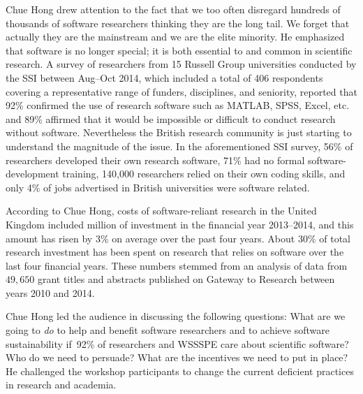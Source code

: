 \documentclass[11pt, oneside]{amsart}
\begin{document}
Chue Hong drew attention to the fact that we too often disregard hundreds of
thousands of software researchers thinking they are the long tail. We forget
that actually they are the mainstream and we are the elite minority. He
emphasized that software is no longer special; it is both essential to and
common in scientific research. A survey of researchers from 15 Russell Group
universities conducted by the SSI between Aug--Oct 2014, which included a total
of 406 respondents covering a representative range of funders, disciplines, and
seniority, reported that 92\% confirmed the use of research software such as
MATLAB, SPSS, Excel, etc. and 89\% affirmed that it would be impossible or
difficult to conduct research without software. Nevertheless the British
research community is just starting to understand the magnitude of the issue. In
the aforementioned SSI survey, 56\% of researchers developed their own research
software, 71\% had no formal software-development training, 140,000 researchers
relied on their own coding skills, and only 4\% of jobs advertised in British
universities were software related.
 
According to Chue Hong, costs of software-reliant research in the United Kingdom
included  million of investment in the financial year
2013--2014, and this amount has risen by 3\% on average over the past four
years. About 30\% of total research investment has been spent on research that
relies on software over the last four financial years. These numbers stemmed
from an analysis of data from $49,650$ grant titles and abstracts published on
Gateway to Research between years 2010 and 2014.
 
Chue Hong led the audience in discussing the following questions: What are we
going to \emph{do} to help and benefit software researchers and to achieve
software sustainability if~92\% of researchers and WSSSPE care about scientific
software? Who do we need to persuade? What are the incentives we need to put in
place? He challenged the workshop participants to change the current deficient
practices in research and academia.

\begin{comment}
With apologies to Greg Wilson:
\href{http://software-carpentry.org/blog/2013/10/you-keep-using-that-word.html}
{You Keep Using That Word}
We can talk all day about the best ways of achieving sustainability
But what are we going to do to make it actually sustainable?

Careers outside academic sector: 
Non-university Research (industry, government, etc.)
UK STEM graduate career paths: Early Career Research, Permanent Research Staff,
Professor.
The Scientific Century, Royal Society, 2010 (revised to reflect first stage
clarification from ``What Do PhD's Do?'' study.)
Who	are the people  we need to persuade?
What	 are	the incentives we need to put in place?
How are we going to show that the work we present here has benefit to the 92\%?
We are all the 92\%	and we can change the world if we	want!
\end{comment} 
\end{document}

